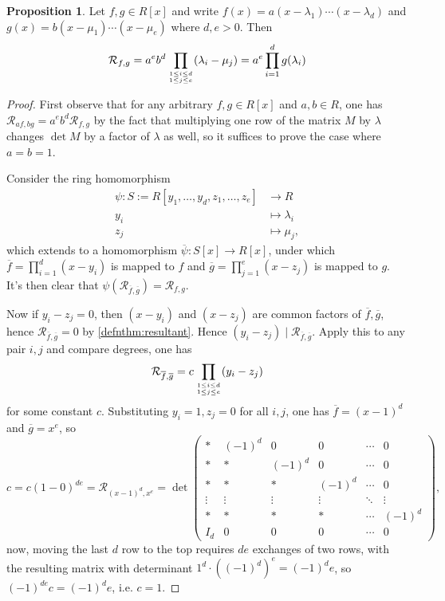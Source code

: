 \documentclass{article}
\newcommand{\re}{\mathcal{R}}
\theoremstyle{definition}
\newtheorem{prop}[defn]{Proposition}
\begin{document}
\begin{prop}
\label{prop:explicitresultant}
Let $f,g\in R[x]$ and write $f(x)=a(x-\lambda_1)\cdots(x-\lambda_d)$ and $g(x)=b(x-\mu_1)\cdots(x-\mu_e)$ where $d,e>0$. Then
\[
\re_{f,g}=a^eb^d\prod_{1\leq i\leq d\atop 1\leq j\leq e}(\lambda_i-\mu_j)=a^e\prod_{i=1}^d g(\lambda_i)
\]
\end{prop}
\begin{proof}
First observe that for any arbitrary $f,g\in R[x]$ and $a,b\in R$, one has $\re_{af,bg}=a^eb^d\re_{f,g}$ by the fact that multiplying one row of the matrix $M$ by $\lambda$ changes $\det M$ by a factor of $\lambda$ as well, so it suffices to prove the case where $a=b=1$.

Consider the ring homomorphism
\[
\begin{aligned}
\psi:S:=R[y_1,\ldots,y_d,z_1,\ldots,z_e]&\rightarrow R \\
y_i&\mapsto\lambda_i \\
z_j&\mapsto\mu_j,
\end{aligned}
\]
which extends to a homomorphism $\overline\psi:S[x]\rightarrow R[x]$, under which $\overline f=\prod_{i=1}^d(x-y_i)$ is mapped to $f$ and $\overline g=\prod_{j=1}^e(x-z_j)$ is mapped to $g$. It's then clear that $\psi\left(\re_{\overline f,\overline g}\right)=\re_{f,g}$.

Now if $y_i-z_j=0$, then $(x-y_i)$ and $(x-z_j)$ are common factors of $\overline f,\overline g$, hence $\re_{\overline f,\overline g}=0$ by \ref{defnthm:resultant}. Hence $(y_i-z_j)\mid\re_{\overline f,\overline g}$. Apply this to any pair $i,j$ and compare degrees, one has
\[
\re_{\overline f,\overline g}=c\prod_{1\leq i\leq d\atop 1\leq j\leq e}(y_i-z_j)
\]
for some constant $c$. Substituting $y_i=1,z_j=0$ for all $i,j$, one has $\overline f=(x-1)^d$ and $\overline g=x^e$, so
\[
c=c(1-0)^{de}=\re_{(x-1)^d,x^e}=\det\left(
\begin{array}{c|cccccc}
\ast & (-1)^d & 0 & 0 & \cdots & 0 \\
\ast & \ast & (-1)^d & 0 & \cdots & 0 \\
\ast & \ast & \ast & (-1)^d & \cdots & 0 \\
\vdots & \vdots & \vdots & \vdots & \ddots & \vdots \\
\ast & \ast & \ast & \ast & \cdots & (-1)^d \\ \hline
I_d & 0 & 0 & 0 & \cdots & 0
\end{array}\right),
\]
now, moving the last $d$ row to the top requires $de$ exchanges of two rows, with the resulting matrix with determinant $1^d\cdot \left((-1)^d\right)^e=(-1)^de$, so $(-1)^{de}c=(-1)^de$, i.e. $c=1$.
\end{proof}
\end{document}
